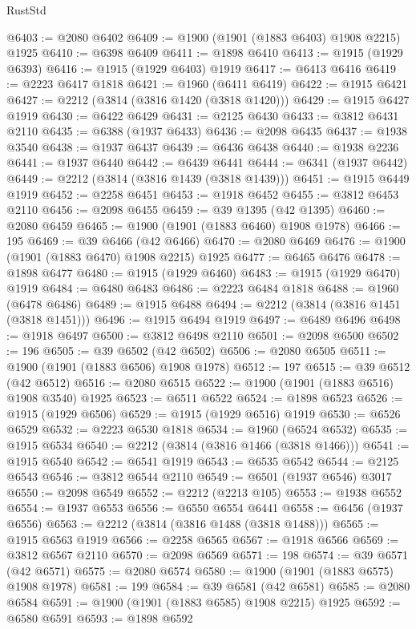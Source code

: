 \begin{lexlean}{RustStd}
\begin{coremodule}
@6403 := @2080 @6402
@6409 := @1900 (@1901 (@1883 @6403) @1908 @2215) @1925
@6410 := @6398 @6409
@6411 := @1898 @6410
@6413 := @1915 (@1929 @6393)
@6416 := @1915 (@1929 @6403) @1919
@6417 := @6413 @6416
@6419 := @2223 @6417 @1818
@6421 := @1960 (@6411 @6419)
@6422 := @1915 @6421
@6427 := @2212 (@3814 (@3816 @1420 (@3818 @1420)))
@6429 := @1915 @6427 @1919
@6430 := @6422 @6429
@6431 := @2125 @6430
@6433 := @3812 @6431 @2110
@6435 := @6388 (@1937 @6433)
@6436 := @2098 @6435
@6437 := @1938 @3540
@6438 := @1937 @6437
@6439 := @6436 @6438
@6440 := @1938 @2236
@6441 := @1937 @6440
@6442 := @6439 @6441
@6444 := @6341 (@1937 @6442)
@6449 := @2212 (@3814 (@3816 @1439 (@3818 @1439)))
@6451 := @1915 @6449 @1919
@6452 := @2258 @6451
@6453 := @1918 @6452
@6455 := @3812 @6453 @2110
@6456 := @2098 @6455
@6459 := @39 @1395 (@42 @1395)
@6460 := @2080 @6459
@6465 := @1900 (@1901 (@1883 @6460) @1908 @1978)
@6466 := 195
@6469 := @39 @6466 (@42 @6466)
@6470 := @2080 @6469
@6476 := @1900 (@1901 (@1883 @6470) @1908 @2215) @1925
@6477 := @6465 @6476
@6478 := @1898 @6477
@6480 := @1915 (@1929 @6460)
@6483 := @1915 (@1929 @6470) @1919
@6484 := @6480 @6483
@6486 := @2223 @6484 @1818
@6488 := @1960 (@6478 @6486)
@6489 := @1915 @6488
@6494 := @2212 (@3814 (@3816 @1451 (@3818 @1451)))
@6496 := @1915 @6494 @1919
@6497 := @6489 @6496
@6498 := @1918 @6497
@6500 := @3812 @6498 @2110
@6501 := @2098 @6500
@6502 := 196
@6505 := @39 @6502 (@42 @6502)
@6506 := @2080 @6505
@6511 := @1900 (@1901 (@1883 @6506) @1908 @1978)
@6512 := 197
@6515 := @39 @6512 (@42 @6512)
@6516 := @2080 @6515
@6522 := @1900 (@1901 (@1883 @6516) @1908 @3540) @1925
@6523 := @6511 @6522
@6524 := @1898 @6523
@6526 := @1915 (@1929 @6506)
@6529 := @1915 (@1929 @6516) @1919
@6530 := @6526 @6529
@6532 := @2223 @6530 @1818
@6534 := @1960 (@6524 @6532)
@6535 := @1915 @6534
@6540 := @2212 (@3814 (@3816 @1466 (@3818 @1466)))
@6541 := @1915 @6540
@6542 := @6541 @1919
@6543 := @6535 @6542
@6544 := @2125 @6543
@6546 := @3812 @6544 @2110
@6549 := @6501 (@1937 @6546) @3017
@6550 := @2098 @6549
@6552 := @2212 (@2213 @105)
@6553 := @1938 @6552
@6554 := @1937 @6553
@6556 := @6550 @6554 @6441
@6558 := @6456 (@1937 @6556)
@6563 := @2212 (@3814 (@3816 @1488 (@3818 @1488)))
@6565 := @1915 @6563 @1919
@6566 := @2258 @6565
@6567 := @1918 @6566
@6569 := @3812 @6567 @2110
@6570 := @2098 @6569
@6571 := 198
@6574 := @39 @6571 (@42 @6571)
@6575 := @2080 @6574
@6580 := @1900 (@1901 (@1883 @6575) @1908 @1978)
@6581 := 199
@6584 := @39 @6581 (@42 @6581)
@6585 := @2080 @6584
@6591 := @1900 (@1901 (@1883 @6585) @1908 @2215) @1925
@6592 := @6580 @6591
@6593 := @1898 @6592

\end{coremodule}
\end{lexlean}
